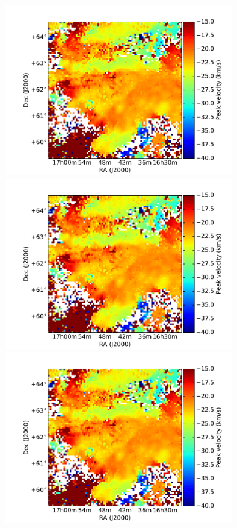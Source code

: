 \documentclass[traditabstract]{aa}
\begin{document}
\begin{figure}[h]
  \centering
  \includegraphics[page=1,height=7.5cm,trim=110 35 105 75,clip=true]{Figures/GHIGLS_velo.pdf}
  \hspace{5mm}
  \includegraphics[page=4,height=7.5cm,trim=110 35 105 75,clip=true]{Figures/GHIGLS_velo.pdf} \\
  \vspace{5mm}
  \includegraphics[page=2,height=7.5cm,trim=110 35 105 75,clip=true]{Figures/GHIGLS_velo.pdf}

\end{figure}
\end{document}

